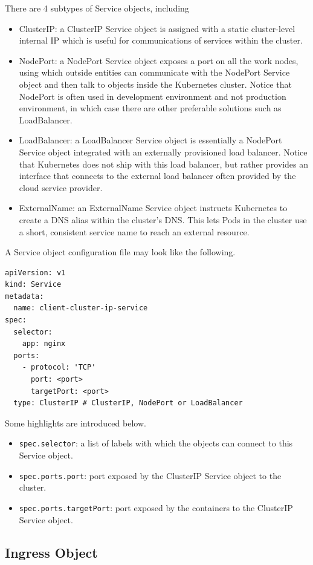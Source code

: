 There are 4 subtypes of Service objects, including
\begin{itemize}
	\item ClusterIP: a ClusterIP Service object is assigned with a static cluster-level internal IP which is useful for communications of services within the cluster.
	\item NodePort: a NodePort Service object exposes a port on all the work nodes, using which outside entities can communicate with the NodePort Service object and then talk to objects inside the Kubernetes cluster. Notice that NodePort is often used in development environment and not production environment, in which case there are other preferable solutions such as LoadBalancer.
	\item LoadBalancer: a LoadBalancer Service object is essentially a NodePort Service object integrated with an externally provisioned load balancer. Notice that Kubernetes does not ship with this load balancer, but rather provides an interface that connects to the external load balancer often provided by the cloud service provider.
	\item ExternalName: an ExternalName Service object instructs Kubernetes to create a DNS alias within the cluster’s DNS. This lets Pods in the cluster use a short, consistent service name to reach an external resource.
\end{itemize}

A Service object configuration file may look like the following.
\begin{lstlisting}
apiVersion: v1
kind: Service
metadata:
  name: client-cluster-ip-service
spec:
  selector:
    app: nginx
  ports:
    - protocol: 'TCP'
      port: <port>
      targetPort: <port>
  type: ClusterIP # ClusterIP, NodePort or LoadBalancer
\end{lstlisting}
Some highlights are introduced below.
\begin{itemize}
  \item \verb|spec.selector|: a list of labels with which the objects can connect to this Service object.
  \item \verb|spec.ports.port|: port exposed by the ClusterIP Service object to the cluster.
  \item \verb|spec.ports.targetPort|: port exposed by the containers to the ClusterIP Service object.
\end{itemize}

\subsection{Ingress Object}

